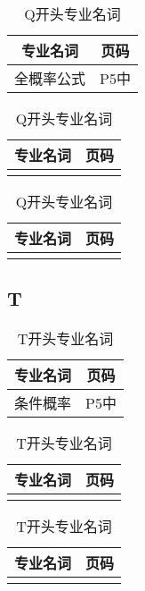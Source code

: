 \documentclass{wx672article}
\begin{document}
 \begin{table}[h!] %
      \centering
        \begin{tabular}[t]{c|c} %
          \hline
          专业名词 &  页码   \\
          \hline
          全概率公式 & P5中 \\
          \hline
        \end{tabular}
        \hfill
        \begin{tabular}[t]{c|c}
          \hline
          专业名词  &  页码  \\
          \hline
           &  \\
          \hline
        \end{tabular}
        \hfill
        \begin{tabular}[t]{c|c}
          \hline
          专业名词 &  页码 \\
          \hline
           &  \\
          \hline
        \end{tabular}
        \caption{Q开头专业名词}\label{tabQ}
    \end{table}
    

\begin{center}
  \section*{T}
\end{center}
\label{sec:}


 \begin{table}[h!] %
      \centering
        \begin{tabular}[t]{c|c} %
          \hline
          专业名词 &  页码   \\
          \hline
          条件概率 & P5中 \\
          \hline
        \end{tabular}
        \hfill
        \begin{tabular}[t]{c|c}
          \hline
          专业名词  &  页码  \\
          \hline
           &  \\
          \hline
        \end{tabular}
        \hfill
        \begin{tabular}[t]{c|c}
          \hline
          专业名词 &  页码 \\
          \hline
           &  \\
          \hline
        \end{tabular}
        \caption{T开头专业名词}\label{tabT}
      \end{table}

      
\end{document}
